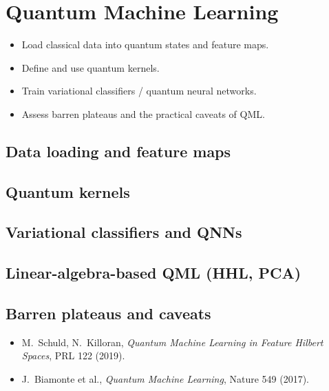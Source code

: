 \chapter{Quantum Machine Learning}
\label{ch:lec20}

\begin{objectives}
\begin{itemize}[leftmargin=1.4em,nosep]
  \item Load classical data into quantum states and feature maps.
  \item Define and use quantum kernels.
  \item Train variational classifiers / quantum neural networks.
  \item Assess barren plateaus and the practical caveats of QML.
\end{itemize}
\end{objectives}


\section{Data loading and feature maps}
\label{sec:lec20-1}

\section{Quantum kernels}
\label{sec:lec20-2}

\section{Variational classifiers and QNNs}
\label{sec:lec20-3}

\section{Linear-algebra-based QML (HHL, PCA)}
\label{sec:lec20-4}

\section{Barren plateaus and caveats}
\label{sec:lec20-5}

\exercisesection
\begin{exercise}
\end{exercise}
\begin{exercise}
\end{exercise}
\begin{exercise}
\end{exercise}

\readingsection
\begin{itemize}[leftmargin=1.4em]
  \item M.~Schuld, N.~Killoran, \emph{Quantum Machine Learning in Feature Hilbert Spaces}, PRL 122 (2019).
  \item J.~Biamonte et al., \emph{Quantum Machine Learning}, Nature 549 (2017).
\end{itemize}
